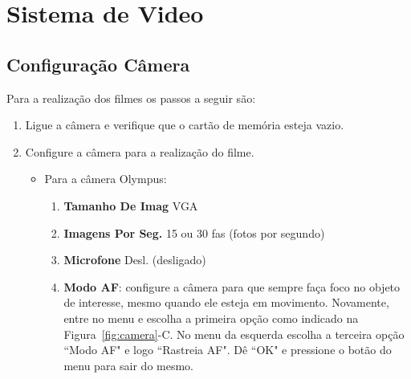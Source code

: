 \chapter{Sistema de Video}\label{image}

\vspace{-0.5cm}

\section*{Configuração Câmera}

Para a realização dos filmes os passos a seguir são:

\begin{enumerate}
\item Ligue a câmera e verifique que o cartão de memória esteja vazio. %

\item Configure a câmera para a realização do filme. 
\begin{itemize}
\item Para a câmera Olympus: %
\begin{enumerate}
\item {\bf Tamanho De Imag} VGA
\item {\bf Imagens Por Seg.} 15 ou 30 fas (fotos por segundo) 
\item {\bf Microfone} Desl.  (desligado)
\item {\bf Modo AF}: configure a câmera para que sempre faça foco no objeto de interesse, mesmo quando ele esteja em movimento. Novamente, entre no menu e escolha a primeira opção como indicado na Figura~\ref{fig:camera}-C. No menu da esquerda escolha a terceira opção ``Modo AF" e logo ``Rastreia AF". Dê ``OK"  e pressione o botão do menu para sair do mesmo.
\end{enumerate}


\end{itemize}
\end{enumerate}
